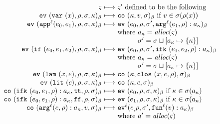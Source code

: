 \documentclass[preprint,onecolumn,9pt]{sigplanconf} %
\begin{document}
\begin{figure*}
  \begin{gather*}
    \begin{array}{@{}r@{\ }c@{\ }l@{}}
      \mstate & \machstep &\mstate' \text{ defined to be the following} \\
      \ev{\svar\mvar, \menv, \msto, \mkont}{\mmlab} &\machstep&
      \co{\mkont, \mval, \msto}{\mmlab}
      \text{ if } \mval \in \msto(\menv(\mvar))
      \\
      \ev{\sapp[^\mlab]{\mexpi0}{\mexpi1}, \menv, \msto, \mkont}{\mmlab} &\machstep&
      \ev{\mexpi0, \menv, \msto', \spush{\kar[^\mlab]{\mexpi1, \menv}}{\mkaddr}}{\mmlab}
      \\
      &&\text{where } \mkaddr = \alloc(\mstate) \\
      &&\phantom{\text{where }} \msto' = \ext{\msto}{\mkaddr}{\setof{\mkont}} \\
      \ev{\sif{\mexpi0}{\mexpi1}{\mexpi2}, \menv, \msto, \mkont}{\mmlab} &\machstep&
      \ev{\mexpi0, \menv, \msto', \spush{\kif{\mexpi1, \mexpi2, \menv}}{\mkaddr}}{\mmlab} \\
      &&\text{where } \mkaddr = \alloc(\mstate) \\
      &&\phantom{\text{where }} \msto' = \ext{\msto}{\mkaddr}{\setof{\mkont}} \\
      \ev{\slam{\mvar}{\mexp}, \menv, \msto, \mkont}{\mmlab} &\machstep&
      \co{\mkont, \clos{\mvar, \mexp, \menv}, \msto}{\mmlab}
      \\
      \ev{\slit{\mconstant}, \menv, \msto, \mkont}{\mmlab} &\machstep&
      \co{\mkont, \mconstant, \msto}{\mmlab}
      \\
      \co{\spush{\kif{\mexpi0, \mexpi1, \menv}}{\mkaddr}, \strue, \menv, \msto}{\mmlab} &\machstep&
      \ev{\mexpi0, \menv, \msto, \mkont}{\mmlab} \text{ if } \mkont \in \msto(\mkaddr)
      \\
      \co{\spush{\kif{\mexpi0, \mexpi1, \menv}}{\mkaddr}, \sfalse, \menv, \msto}{\mmlab} &\machstep&
      \ev{\mexpi1, \menv, \msto, \mkont}{\mmlab} \text{ if } \mkont \in \msto(\mkaddr)
      \\
      \co{\spush{\kar[^\mlab]{\mexp, \menv}}{\mkaddr}, \mval, \msto}{\mmlab} &\machstep&
      \ev[^\mlab]{\mexpi, \menv, \msto', \spush{\kfn[^\mlab]{\mval}}{\mkaddr}}{\mmlab}
      \\
      && \text{where } \maddr' = \alloc(\mstate) \\

\end{array}
\end{gather*}
\end{figure*}
\end{document}
